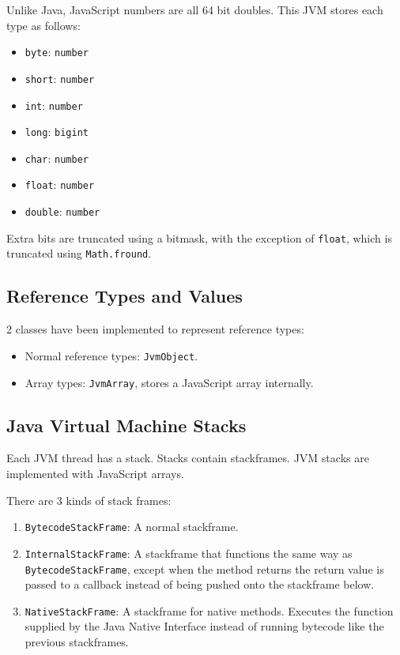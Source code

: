 Unlike Java, JavaScript numbers are all 64 bit doubles. This JVM stores each type as follows:

\begin{itemize}
	\item \texttt{byte}: \texttt{number}
	\item \texttt{short}: \texttt{number}
	\item \texttt{int}: \texttt{number}
	\item \texttt{long}: \texttt{bigint}
	\item \texttt{char}: \texttt{number}
	\item \texttt{float}: \texttt{number}
	\item \texttt{double}: \texttt{number}
\end{itemize}

Extra bits are truncated using a bitmask, with the exception 
of \texttt{float}, which is truncated using \texttt{Math.fround}.

\subsection{Reference Types and Values}

2 classes have been implemented to represent reference types:

\begin{itemize}
\item Normal reference types: \texttt{JvmObject}.
\item Array types: \texttt{JvmArray}, stores a JavaScript array internally.
\end{itemize}


\subsection{Java Virtual Machine Stacks}

Each JVM thread has a stack. Stacks contain stackframes. 
JVM stacks are implemented with JavaScript arrays.

There are 3 kinds of stack frames:

\begin{enumerate}
\item \texttt{BytecodeStackFrame}: A normal stackframe.
\item \texttt{InternalStackFrame}: A stackframe that functions the same way as \texttt{BytecodeStackFrame}, except when the method returns the return value is passed to a callback instead of being pushed onto the stackframe below.
\item \texttt{NativeStackFrame}: A stackframe for native methods. Executes the function supplied by the Java Native Interface instead of running bytecode like the previous stackframes.
\end{enumerate}


